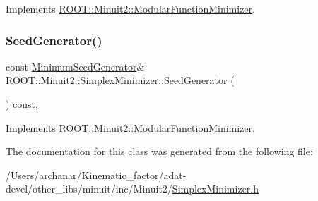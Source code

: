 Implements \mbox{\hyperlink{classROOT_1_1Minuit2_1_1ModularFunctionMinimizer_a742930de97b0ce9ba23773874ae0894b}{R\+O\+O\+T\+::\+Minuit2\+::\+Modular\+Function\+Minimizer}}.

\mbox{\label{classROOT_1_1Minuit2_1_1SimplexMinimizer_a7385d3ee5e4a48a796b11b51f7f0c408}} 
\subsubsection{\texorpdfstring{SeedGenerator()}{SeedGenerator()}\hspace{0.1cm}{\footnotesize\ttfamily [3/3]}}
{\footnotesize\ttfamily const \mbox{\hyperlink{classROOT_1_1Minuit2_1_1MinimumSeedGenerator}{Minimum\+Seed\+Generator}}\& R\+O\+O\+T\+::\+Minuit2\+::\+Simplex\+Minimizer\+::\+Seed\+Generator (\begin{DoxyParamCaption}{ }\end{DoxyParamCaption}) const\hspace{0.3cm}{\ttfamily [inline]}, {\ttfamily [virtual]}}



Implements \mbox{\hyperlink{classROOT_1_1Minuit2_1_1ModularFunctionMinimizer_a742930de97b0ce9ba23773874ae0894b}{R\+O\+O\+T\+::\+Minuit2\+::\+Modular\+Function\+Minimizer}}.



The documentation for this class was generated from the following file\+:\begin{DoxyCompactItemize}
\item 
/\+Users/archanar/\+Kinematic\+\_\+factor/adat-\/devel/other\+\_\+libs/minuit/inc/\+Minuit2/\mbox{\hyperlink{adat-devel_2other__libs_2minuit_2inc_2Minuit2_2SimplexMinimizer_8h}{Simplex\+Minimizer.\+h}}\end{DoxyCompactItemize}
